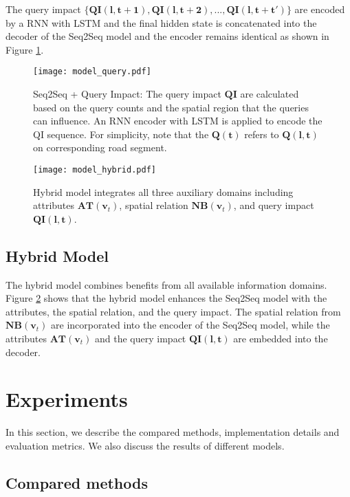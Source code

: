 The query impact $\{\bm{QI (l, t+1)}, \bm{QI (l, t+2)}, ..., \bm{QI (l, t+t')} \}$ are encoded by a RNN with LSTM and the final hidden state is concatenated into the decoder of the Seq2Seq model and the encoder remains identical as shown in Figure  \ref{fig:model_query}.

\begin{figure}[htbp]
\centering
\texttt{[image: model\_query.pdf]}
\caption{Seq2Seq + Query Impact: The query impact $\bm{QI}$ are calculated based on the query counts and the spatial region that the queries can influence. An RNN encoder with LSTM is applied to encode the QI sequence. For simplicity, note that the $\bm{Q (t)}$ refers to $\bm{Q (l, t)}$ on corresponding road segment.}
\label{fig:model_query}
\end{figure}

\begin{figure}[htbp]
\centering
\texttt{[image: model\_hybrid.pdf]}
\caption{Hybrid model integrates all three auxiliary domains including attributes $\bm{AT} (\bm{v}_t)$, spatial relation $\bm{NB} (\bm{v}_t)$, and query impact $\bm{QI(l, t)}$.}
\label{fig:model_hybrid}
\end{figure}

\subsection{Hybrid Model}

The hybrid model combines benefits from all available information domains. Figure  \ref{fig:model_hybrid} shows that the hybrid model enhances the Seq2Seq model with the attributes, the spatial relation, and the query impact. The spatial relation from $\bm{NB} (\bm{v}_t)$ are incorporated into the encoder of the Seq2Seq model, while the attributes $\bm{AT} (\bm{v}_t)$ and the query impact $\bm{QI(l, t)} $ are embedded into the decoder.

\section{Experiments}
\label{experiments}
In this section, we describe the compared methods, implementation details and evaluation metrics. We also discuss the results of different models.
\subsection{Compared methods}
\label{comparedmethods}

